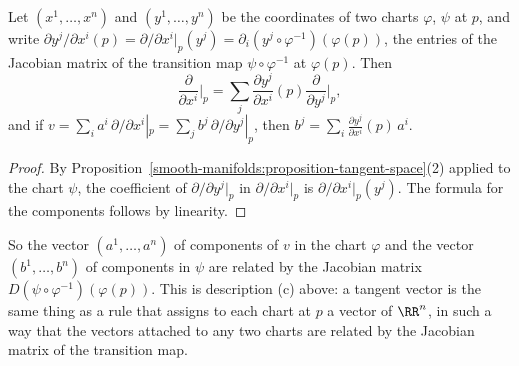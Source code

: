 \begin{proposition}\label{smooth-manifolds:proposition-change-of-coordinates}
Let $(x^1, \ldots, x^n)$ and $(y^1, \ldots, y^n)$ be the coordinates of two charts $\varphi$, $\psi$ at $p$, and write
$\partial y^j/\partial x^i(p) = \partial/\partial x^i|_p(y^j) = \partial_i(y^j \circ \varphi^{-1})(\varphi(p))$, the entries of the Jacobian matrix of the
transition map $\psi \circ \varphi^{-1}$ at $\varphi(p)$. Then
\[
\frac{\partial}{\partial x^i}\Big|_p = \sum_j\frac{\partial y^j}{\partial x^i}(p)\frac{\partial}{\partial y^j}\Big|_p,
\]
and if $v = \sum_ia^i\,\partial/\partial x^i|_p = \sum_jb^j\,\partial/\partial y^j|_p$, then $b^j = \sum_i\frac{\partial y^j}{\partial x^i}(p)\,a^i$.
\end{proposition}

\begin{proof}
By Proposition~\ref{smooth-manifolds:proposition-tangent-space}(2) applied to the chart $\psi$, the coefficient of $\partial/\partial y^j|_p$ in
$\partial/\partial x^i|_p$ is $\partial/\partial x^i|_p(y^j)$. The formula for the components follows by linearity.
\end{proof}

So the vector $(a^1, \ldots, a^n)$ of components of $v$ in the chart $\varphi$ and the vector $(b^1, \ldots, b^n)$ of components in $\psi$ are related by the
Jacobian matrix $D(\psi \circ \varphi^{-1})(\varphi(p))$. This is description (c) above: a tangent vector is the same thing as a rule that assigns to each chart
at $p$ a vector of $\RR^n$, in such a way that the vectors attached to any two charts are related by the Jacobian matrix of the transition map.

